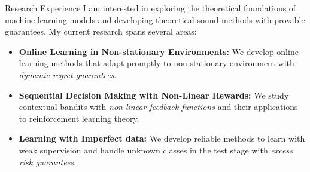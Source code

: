 \documentclass{resume} %
\begin{document}
\begin{rSection}{Research Experience}
I am interested in exploring the theoretical foundations of machine learning models and developing theoretical sound methods with provable guarantees. My current research spans several areas:
\begin{itemize}
	\item \textbf{Online Learning in Non-stationary Environments:} We develop online learning methods that adapt promptly to non-stationary environment with \emph{dynamic regret guarantees}.
	\item \textbf{Sequential Decision Making with Non-Linear Rewards:} We study contextual bandits with \emph{non-linear feedback functions} and their applications to reinforcement learning theory.
	\item \textbf{Learning with Imperfect data:} We develop reliable methods to learn with weak supervision and handle unknown classes in the test stage with \emph{excess risk guarantees}.
\end{itemize}
\end{rSection}
	
\end{document}
